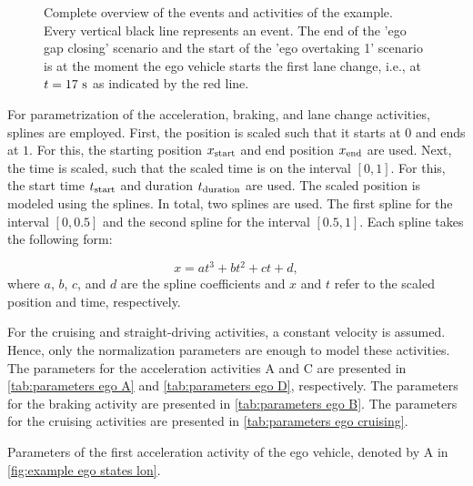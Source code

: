 \documentclass[10pt,final,a4paper,oneside,onecolumn]{article}
\newlength\figurewidth
\newlength\figureheight
\theoremstyle{plain}\newtheorem{definition}{Definition}[section]    %
\theoremstyle{definition}\newtheorem{example}{Example}[section]     %
\theoremstyle{remark}\newtheorem{remarkenv}{Remark}[section]        %
\begin{document}
\begin{figure}
	\centering
	\setlength\figureheight{170pt}
	\setlength\figurewidth{\linewidth}
	\caption{Complete overview of the events and activities of the example. Every vertical black line represents an event. The end of the 'ego gap closing' scenario and the start of the 'ego overtaking 1' scenario is at the moment the ego vehicle starts the first lane change, i.e., at $t=17\ \textup{s}$ as indicated by the red line.}
	\label{fig:example events}
\end{figure}

For parametrization of the acceleration, braking, and lane change activities, splines are employed. First, the position is scaled such that it starts at $0$ and ends at $1$. For this, the starting position $x_{\textup{start}}$ and end position $x_{\textup{end}}$ are used. Next, the time is scaled, such that the scaled time is on the interval $[0, 1]$. For this, the start time $t_{\textup{start}}$ and duration $t_{\textup{duration}}$ are used. The scaled position is modeled using the splines. In total, two splines are used. The first spline for the interval $[0, 0.5]$ and the second spline for the interval $[0.5, 1]$. Each spline takes the following form:

\begin{equation}
	x = at^3 + bt^2 + ct + d,
\end{equation}
where $a$, $b$, $c$, and $d$ are the spline coefficients and $x$ and $t$ refer to the scaled position and time, respectively. 

For the cruising and straight-driving activities, a constant velocity is assumed. Hence, only the normalization parameters are enough to model these activities. The parameters for the acceleration activities A and C are presented in \cref{tab:parameters ego A} and \cref{tab:parameters ego D}, respectively. The parameters for the braking activity are presented in \cref{tab:parameters ego B}. The parameters for the cruising activities are presented in \cref{tab:parameters ego cruising}.

\begin{table}
	\centering
	\caption{Parameters of the first acceleration activity of the ego vehicle, denoted by A in \cref{fig:example ego states lon}.}
	\label{tab:parameters ego A}
	\begin{minipage}[b]{.33\linewidth}
		\centering
	\end{minipage}%
	\begin{minipage}[b]{.5\linewidth}
		\centering
	\end{minipage}%
\end{table}
\end{document}
